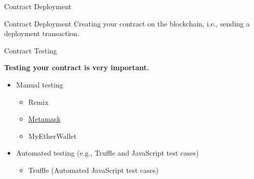 \documentclass[]{beamer}
\begin{document}
\begin{frame}{Contract Deployment}

	\begin{figure}
		\begingroup
			
		\endgroup
	\end{figure}
		
	\begin{keytakeaway}{Contract Deployment}
		Creating your contract on the blockchain, i.e., sending a deployment transaction.
	\end{keytakeaway}
	
	\vspace{1.5em}
\end{frame}

\begin{frame}{Contract Testing}

	\begin{figure}
		\begingroup
			
		\endgroup
	\end{figure}
		
	\textbf{Testing your contract is very important.}\\
	
	\begin{itemize}
		\item<2-> Manual testing
		\begin{itemize}
			\item<2-> Remix
			\item<2-> \href{}{\link Metamask}
			\item<2-> MyEtherWallet
		\end{itemize}
		\item<3-> Automated testing (e.g., Truffle and JavaScript test cases)
		\begin{itemize}
			\item<3-> Truffle (Automated JavaScript test cases)
		\end{itemize}
	\end{itemize}
\end{frame}

%	
%	
\end{document}
